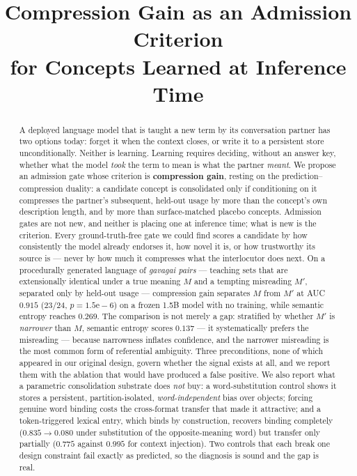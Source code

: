 \documentclass[11pt]{article}
\title{Compression Gain as an Admission Criterion\\
       for Concepts Learned at Inference Time}
\author{}
\date{}
\newcommand{\M}{\ensuremath{M}}
\newcommand{\Mp}{\ensuremath{M'}}
\begin{document}
\maketitle

\begin{abstract}
A deployed language model that is taught a new term by its conversation partner has two
options today: forget it when the context closes, or write it to a persistent store
unconditionally. Neither is learning. Learning requires deciding, without an answer key,
whether what the model \emph{took} the term to mean is what the partner \emph{meant}.
We propose an admission gate whose criterion is \textbf{compression gain}, resting on the
prediction--compression duality: a candidate
concept is consolidated only if conditioning on it compresses the partner's subsequent,
held-out usage by more than the concept's own description length, and by more than
surface-matched placebo concepts. Admission gates are not new, and neither is placing one
at inference time; what is new is the criterion. Every ground-truth-free gate we could
find scores a candidate by how consistently the model already endorses it, how novel it
is, or how trustworthy its source is --- never by how much it compresses what the
interlocutor does next.
On a procedurally generated language of \emph{gavagai pairs} --- teaching sets that are
extensionally identical under a true meaning \M{} and a tempting misreading \Mp{}, separated
only by held-out usage --- compression gain separates \M{} from \Mp{} at AUC $0.915$
($23/24$, $p{=}1.5\mathrm{e}{-}6$) on a frozen 1.5B model with no training, while semantic
entropy reaches $0.269$. The comparison is not merely a gap: stratified by whether \Mp{} is
\emph{narrower} than \M{}, semantic entropy scores $0.137$ --- it systematically prefers the
misreading --- because narrowness inflates confidence, and the narrower misreading is the
most common form of referential ambiguity.
Three preconditions, none of which appeared in our original design, govern whether the
signal exists at all, and we report them with the ablation that would have produced a false
positive. We also report what a parametric consolidation substrate does \emph{not} buy: a
word-substitution control shows it stores a persistent, partition-isolated,
\emph{word-independent} bias over objects; forcing genuine word binding costs the
cross-format transfer that made it attractive; and a token-triggered lexical entry, which
binds by construction, recovers binding completely ($0.835 \to 0.080$ under substitution of
the opposite-meaning word) but transfer only partially ($0.775$ against $0.995$ for context
injection). Two controls that each break one design constraint fail exactly as predicted,
so the diagnosis is sound and the gap is real.
\end{abstract}
\end{document}
